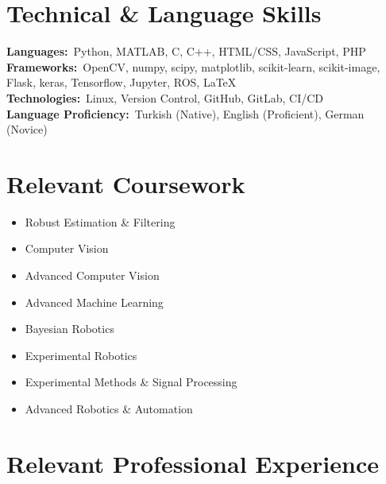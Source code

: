 \documentclass[letterpaper,11pt]{article}
\begin{document}
\section{Technical \& Language Skills}
 \begin{itemize}[leftmargin=0.15in, label={}]
    \small{\item{
     \textbf{Languages:}{~Python, MATLAB, C, C++, HTML/CSS, JavaScript, PHP} \\
	 \textbf{Frameworks:}{~OpenCV, numpy, scipy, matplotlib, scikit-learn, scikit-image, Flask, keras, Tensorflow, Jupyter, ROS, \LaTeX} \\
     \textbf{Technologies:}{~Linux, Version Control, GitHub, GitLab, CI/CD} \\
	 \textbf{Language Proficiency:}{~Turkish (Native), English (Proficient), German (Novice)}
    }}
 \end{itemize}
 \vspace{-16pt}

%
\section{Relevant Coursework}
	\begin{multicols}{3}
		\begin{itemize}[itemsep=-5pt, parsep=3pt]
			\item\small Robust Estimation \& Filtering
			\item Computer Vision
			\item Advanced Computer Vision
			\item Advanced Machine Learning
			\item Bayesian Robotics
			\item Experimental Robotics
			\item Experimental Methods \& Signal Processing
			\item Advanced Robotics \& Automation
		\end{itemize}
	\end{multicols}
	\vspace*{2.0\multicolsep}

\section{Relevant Professional Experience}
  \resumeSubHeadingListStart
\end{document}
